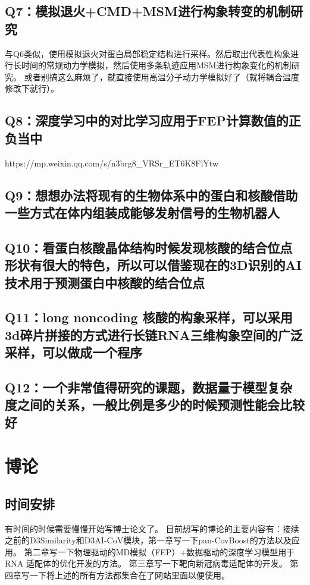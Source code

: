 \section{Q7：模拟退火+CMD+MSM进行构象转变的机制研究}
与Q6类似，使用模拟退火对蛋白局部稳定结构进行采样。然后取出代表性构象进行长时间的常规动力学模拟，然后使用多条轨迹应用MSM进行构象变化的机制研究。
或者别搞这么麻烦了，就直接使用高温分子动力学模拟好了（就将耦合温度修改下就行）。
\section{Q8：深度学习中的对比学习应用于FEP计算数值的正负当中}
https://mp.weixin.qq.com/s/n3brg8\_VRSr\_ET6K8FlYtw
\section{Q9：想想办法将现有的生物体系中的蛋白和核酸借助一些方式在体内组装成能够发射信号的生物机器人}
\section{Q10：看蛋白核酸晶体结构时候发现核酸的结合位点形状有很大的特色，所以可以借鉴现在的3D识别的AI技术用于预测蛋白中核酸的结合位点}
\section{Q11：long noncoding 核酸的构象采样，可以采用3d碎片拼接的方式进行长链RNA三维构象空间的广泛采样，可以做成一个程序}
\section{Q12：一个非常值得研究的课题，数据量于模型复杂度之间的关系，一般比例是多少的时候预测性能会比较好}
\chapter{博论}
\section{时间安排}

有时间的时候需要慢慢开始写博士论文了。
\newline \noindent 目前想写的博论的主要内容有：接续之前的D3Similarity和D3AI-CoV模块，第一章写一下pan-CovBoost的方法以及应用。
\newline \noindent 第二章写一下物理驱动的MD模拟（FEP）+数据驱动的深度学习模型用于RNA 适配体的优化开发的方法。
\newline \noindent 第三章写一下靶向新冠病毒适配体的开发。
\newline \noindent 第四章写一下将上述的所有方法都集合在了网站里面以便使用。
